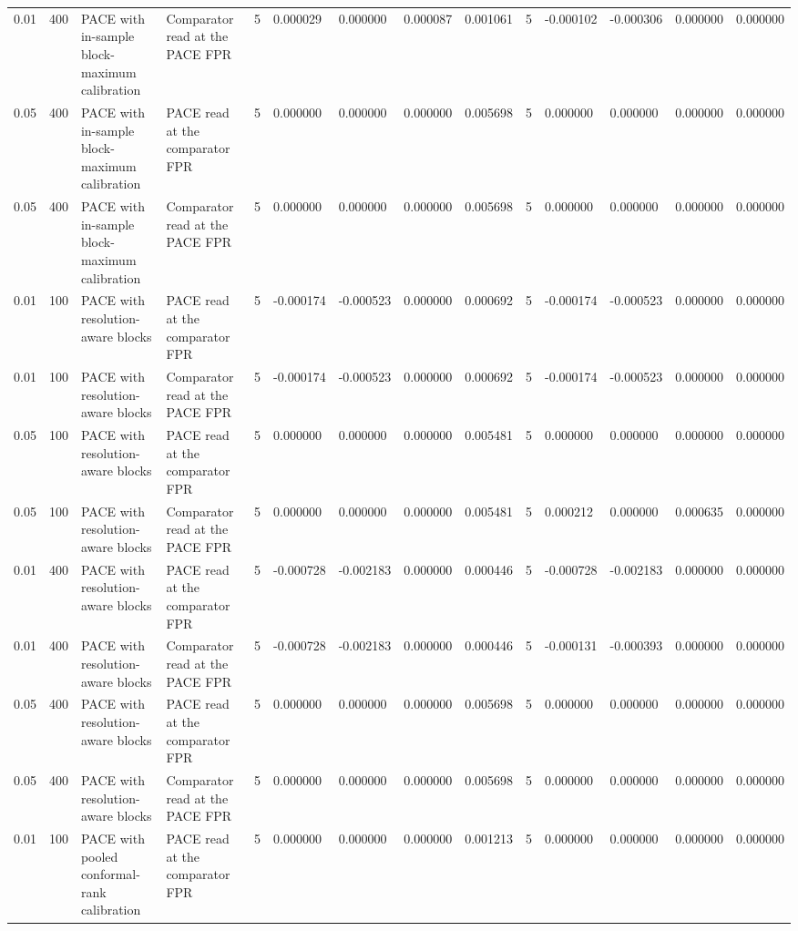 \begin{tabular}{llllllllllllll}
0.01 & 400 & PACE with in-sample block-maximum calibration & Comparator read at the PACE FPR & 5 & 0.000029 & 0.000000 & 0.000087 & 0.001061 & 5 & -0.000102 & -0.000306 & 0.000000 & 0.000000 \\
0.05 & 400 & PACE with in-sample block-maximum calibration & PACE read at the comparator FPR & 5 & 0.000000 & 0.000000 & 0.000000 & 0.005698 & 5 & 0.000000 & 0.000000 & 0.000000 & 0.000000 \\
0.05 & 400 & PACE with in-sample block-maximum calibration & Comparator read at the PACE FPR & 5 & 0.000000 & 0.000000 & 0.000000 & 0.005698 & 5 & 0.000000 & 0.000000 & 0.000000 & 0.000000 \\
0.01 & 100 & PACE with resolution-aware blocks & PACE read at the comparator FPR & 5 & -0.000174 & -0.000523 & 0.000000 & 0.000692 & 5 & -0.000174 & -0.000523 & 0.000000 & 0.000000 \\
0.01 & 100 & PACE with resolution-aware blocks & Comparator read at the PACE FPR & 5 & -0.000174 & -0.000523 & 0.000000 & 0.000692 & 5 & -0.000174 & -0.000523 & 0.000000 & 0.000000 \\
0.05 & 100 & PACE with resolution-aware blocks & PACE read at the comparator FPR & 5 & 0.000000 & 0.000000 & 0.000000 & 0.005481 & 5 & 0.000000 & 0.000000 & 0.000000 & 0.000000 \\
0.05 & 100 & PACE with resolution-aware blocks & Comparator read at the PACE FPR & 5 & 0.000000 & 0.000000 & 0.000000 & 0.005481 & 5 & 0.000212 & 0.000000 & 0.000635 & 0.000000 \\
0.01 & 400 & PACE with resolution-aware blocks & PACE read at the comparator FPR & 5 & -0.000728 & -0.002183 & 0.000000 & 0.000446 & 5 & -0.000728 & -0.002183 & 0.000000 & 0.000000 \\
0.01 & 400 & PACE with resolution-aware blocks & Comparator read at the PACE FPR & 5 & -0.000728 & -0.002183 & 0.000000 & 0.000446 & 5 & -0.000131 & -0.000393 & 0.000000 & 0.000000 \\
0.05 & 400 & PACE with resolution-aware blocks & PACE read at the comparator FPR & 5 & 0.000000 & 0.000000 & 0.000000 & 0.005698 & 5 & 0.000000 & 0.000000 & 0.000000 & 0.000000 \\
0.05 & 400 & PACE with resolution-aware blocks & Comparator read at the PACE FPR & 5 & 0.000000 & 0.000000 & 0.000000 & 0.005698 & 5 & 0.000000 & 0.000000 & 0.000000 & 0.000000 \\
0.01 & 100 & PACE with pooled conformal-rank calibration & PACE read at the comparator FPR & 5 & 0.000000 & 0.000000 & 0.000000 & 0.001213 & 5 & 0.000000 & 0.000000 & 0.000000 & 0.000000 \\

\end{tabular}
